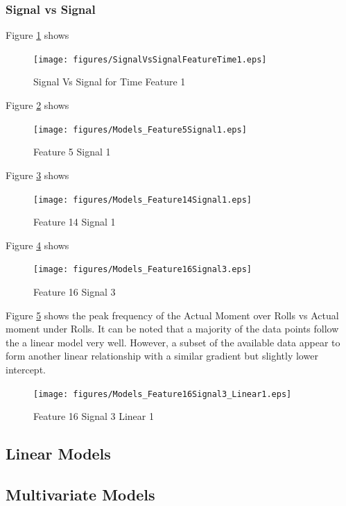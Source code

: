 \documentclass{article}
\begin{document}
\subsubsection{Signal vs Signal}
Figure \ref{fig:SignalVsSignalFeatureTime1} shows 
\begin{figure}[H]
    \centering
    \texttt{[image: figures/SignalVsSignalFeatureTime1.eps]}
    \caption{Signal Vs Signal for Time Feature 1}
    \label{fig:SignalVsSignalFeatureTime1}
\end{figure}


Figure \ref{fig:Models_Feature5Signal1} shows 
\begin{figure}[H]
    \centering
    \texttt{[image: figures/Models\_Feature5Signal1.eps]}
    \caption{Feature 5 Signal 1}
    \label{fig:Models_Feature5Signal1}
\end{figure}


Figure \ref{fig:Models_Feature14Signal1} shows 
\begin{figure}[H]
    \centering
    \texttt{[image: figures/Models\_Feature14Signal1.eps]}
    \caption{Feature 14 Signal 1}
    \label{fig:Models_Feature14Signal1}
\end{figure}

Figure \ref{fig:Models_Feature16Signal3} shows 
\begin{figure}[H]
    \centering
    \texttt{[image: figures/Models\_Feature16Signal3.eps]}
    \caption{Feature 16 Signal 3}
    \label{fig:Models_Feature16Signal3}
\end{figure}

Figure \ref{fig:Models_Feature16Signal3_Linear1} shows the peak frequency of the Actual Moment over Rolls vs Actual moment under Rolls. It can be noted that a majority of the data points follow the a linear model very well. However, a subset of the available data appear to form another linear relationship with a similar gradient but slightly lower intercept.
\begin{figure}[H]
    \centering
    \texttt{[image: figures/Models\_Feature16Signal3\_Linear1.eps]}
    \caption{Feature 16 Signal 3 Linear 1}
    \label{fig:Models_Feature16Signal3_Linear1}
\end{figure}

\subsection{Linear Models}

\subsection{Multivariate Models}
\end{document}
